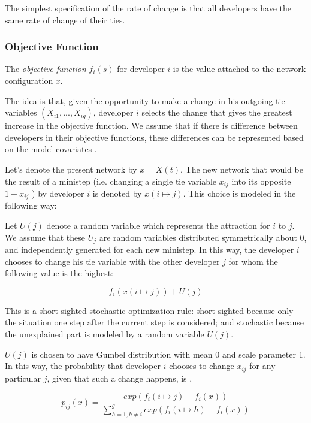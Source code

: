 \documentclass[12pt,letterpaper]{gthesis2}  %
\begin{document}
The simplest specification of the rate of change is that all developers have the same rate of change of their ties. 

\subsubsection*{Objective Function}

The \textit{objective function} $f_i(s)$ for developer $i$ is the value attached to the network configuration $x$. 

The idea is that, given the opportunity to make a change in his outgoing tie variables $(X_{i1},...,X_{ig})$, developer $i$ selects the change that gives the greatest increase in the objective function. We assume that if there is difference between developers in their objective functions, these differences can be represented based on the model covariates \cite{Snijders2004}. 

Let's denote the present network by $x = X(t)$. The new network that would be the result of a ministep (i.e. changing a single tie variable $x_{ij}$ into its opposite $1 - x_{ij}$ ) by developer $i$ is denoted by $x(i \mapsto j)$. This choice is modeled in the following way: 

Let $U(j)$ denote a random variable which represents the attraction for $i$ to $j$. We assume that these $U_j$ are random variables distributed symmetrically about 0, and independently generated for each new ministep. In this way, the developer $i$ chooses to change his tie variable with the other developer $j$ for whom the following value \cite{Snijders2004} is the highest:

\begin{equation}
f_i(x(i \mapsto j)) + U(j)
\end{equation} 

This is a short-sighted stochastic optimization rule: short-sighted because only the situation one step after the current step is considered; and stochastic because the unexplained part is modeled by a random variable $U(j)$. 

$U(j)$ is chosen to have Gumbel distribution with mean 0 and scale parameter 1. In this way, the probability that developer $i$ chooses to change $x_{ij}$ for any particular $j$, given that such a change happens, is \cite{Snijders2004},

\begin{equation}
p_{ij}(x) = \frac{exp(f_i(i \mapsto j) - f_i(x))}{\sum_{h=1, h \neq i}^{g} exp(f_i(i \mapsto h) - f_i(x))}
\end{equation}
\end{document}
